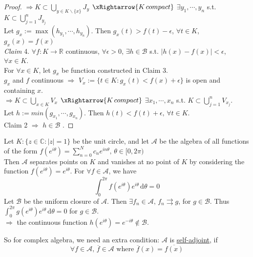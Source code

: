 \begin{proof}
       $ \Rightarrow K\subset \bigcup\limits_{y\in K\backslash \{x\}}J_y $  $ \xRightarrow{K\,compact} $ $ \exists y_1,\cdots,y_n  $ s.t.  $ K\subset \bigcup\limits_{j=1 }^n J_{y_j}$\\
       Let  $ g_x:=\max(h_{y_1},\cdots,h_{y_n}) $. Then  $ g_x(t)>f(t)-\epsilon  $,  $ \forall t\in K  $,  $ g_x(x)=f(x) $\\
       \textit{Claim} 4.  $ \forall f:K\rightarrow \mathbb{R } $ continuous,  $ \forall \epsilon>0 $,  $ \exists  h\in  \mathscr{B } $ s.t.  $ |h(x)-f(x)|<\epsilon $, $ \forall x\in K   $.\\
       For  $ \forall x\in K  $, let  $ g_x  $ be function constructed in Claim 3.\\
        $ g_x  $ and  $ f  $ continuous  $ \Rightarrow  $   $ V_x:=\{t\in K :g_x(t)<f(x)+\epsilon \} $ is open and containing  $ x  $.\\
        $ \Rightarrow K\subset \bigcup\limits_{x\in K }V_x $  $ \xRightarrow{K\,compact} $ $ \exists x_1,\cdots,x_n  $ s.t.  $ K\subset \bigcup\limits_{j=1 }^n V_{x_j}$.\\
        Let  $ h:=min(g_{x_1},\cdots,g_{x_n }) $. Then  $ h(t)<f(t)+\epsilon,\,\forall t\in K  $.\\
        Claim 2  $ \Rightarrow  $  $ h\in  \mathscr{B } $ .
\end{proof}
\begin{example}
    Let  $ K:\{z\in \mathbb{C }:|z|=1\} $ be the unit circle, and let  $  \mathscr{A } $ be the algebra of  all functions of the form  $ f(e^{i\theta })=\sum\limits_{n=0 }^{N } c_n e^{in\theta},\,\theta \in [0,2\pi) $\\
    Then  $  \mathscr{A } $ separates points on  $ K  $ and vanishes at no point of  $ K  $ by considering the function  $ f(e^{i\theta })=e^{i\theta} $. For  $ \forall f\in  \mathscr{A } $, we have 
    \[\int_{0 }^{2\pi } f(e^{i\theta})e^{i\theta}\, \mathrm{d}\theta=0  \]  
    Let  $  \mathscr{B } $ be the uniform closure of  $  \mathscr{A } $. Then  $ \exists f_n\in  \mathscr{A },\, f_n\rightrightarrows g $, for  $ g\in  \mathscr{B } $. Thus  $ \int_{0 }^{2\pi } g(e^{i\theta})e^{i\theta}\, \mathrm{d}\theta=0 $ for  $ g\in  \mathscr{B} $.\\
     $ \Rightarrow  $ the continuous function  $ h(e^{i\theta })=e^{-i\theta} \not\in  \mathscr{B}$.\\     
\end{example}
So for complex algebra, we need an extra condition: $  \mathscr{A } $ is \underline{self-adjoint}, if 
\[\forall f\in  \mathscr{A },\,\overline{f}\in  \mathscr{A}\text{ where }\overline{f}(x)=\overline{f(x)}\]
